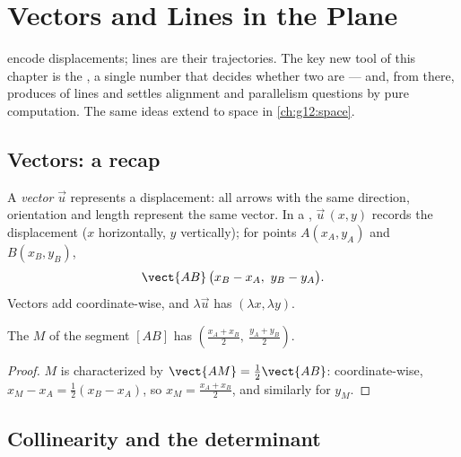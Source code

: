 \chapter{Vectors and Lines in the Plane}\label{ch:g11:vect}

 encode displacements; lines are their trajectories. The key new
tool of this chapter is the \emph{}, a single number that
decides whether two  are  --- and, from there, produces
 of lines and settles alignment and parallelism questions by pure
computation. The same ideas extend to space in \cref{ch:g12:space}.

\section{Vectors: a recap}

\begin{definition}\label{def:g11:vect:vector}
A \emph{vector} $\vec u$ represents a displacement: all
arrows with the same direction, orientation and length represent the same
vector. In a , $\vec u\,(x, y)$ records the displacement
($x$ horizontally, $y$ vertically); for points $A(x_A, y_A)$ and
$B(x_B, y_B)$,
\[
\vect{AB}\,\bigl(x_B - x_A,\ y_B - y_A\bigr).
\]
Vectors add coordinate-wise, and $\lambda\vec u$ has 
$(\lambda x, \lambda y)$.
\end{definition}

\begin{proposition}[Midpoint]\label{prop:g11:vect:midpoint}
The  $M$ of the segment $[AB]$ has 
$\left(\frac{x_A + x_B}{2},\ \frac{y_A + y_B}{2}\right)$.
\end{proposition}

\begin{proof}
$M$ is characterized by $\vect{AM} = \frac12\vect{AB}$: coordinate-wise,
$x_M - x_A = \frac12(x_B - x_A)$, so $x_M = \frac{x_A + x_B}{2}$, and
similarly for $y_M$.
\end{proof}

\section{Collinearity and the determinant}

